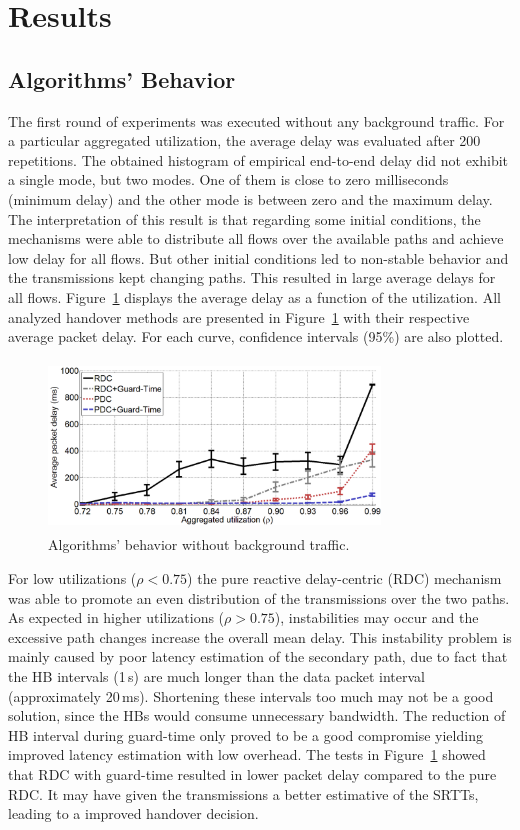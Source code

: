 \documentclass{sbrt2015}
\begin{document}
\section{Results}
\subsection{Algorithms' Behavior}
The first round of experiments was executed without any background traffic. For a particular aggregated utilization, the average delay was evaluated after 200 repetitions. The obtained histogram of empirical end-to-end delay did not exhibit a single mode, but two modes. One of them is close to zero milliseconds (minimum delay) and the other mode is between zero and the maximum delay. The interpretation of this result is that regarding some initial conditions, the mechanisms were able to distribute all flows over the available paths and achieve low delay for all flows. But other initial conditions led to non-stable behavior and the transmissions kept changing paths. This resulted in large average delays for all flows. Figure~\ref{figura2} displays the average delay as a function of the utilization. All analyzed handover methods are presented in Figure~\ref{figura2} with their respective average packet delay. For each curve, confidence intervals (95\%) are also plotted.

\begin{figure}[h!]
\centering
\includegraphics[width=8.8cm,height=4.5cm]{figura2}
\caption{Algorithms' behavior without background traffic.}
\label{figura2}
\end{figure}

For low utilizations ($\rho < 0.75$) the pure reactive delay-centric (RDC) mechanism was able to promote an even distribution of the transmissions over the two paths. As expected in higher utilizations ($\rho > 0.75$), instabilities may occur and the excessive path changes increase the overall mean delay. This instability problem is mainly caused by poor latency estimation of the secondary path, due to fact that the HB intervals (1\,s) are much longer than the data packet interval (approximately 20\,ms). Shortening these intervals too much may not be a good solution, since the HBs would consume unnecessary bandwidth. The reduction of HB interval during guard-time only proved to be a good compromise yielding improved latency estimation with low overhead. 
The tests in Figure~\ref{figura2} showed that RDC with guard-time resulted in lower packet delay compared to the pure RDC. It may have given the transmissions a better estimative of the SRTTs, leading to a improved handover decision.
\end{document}
